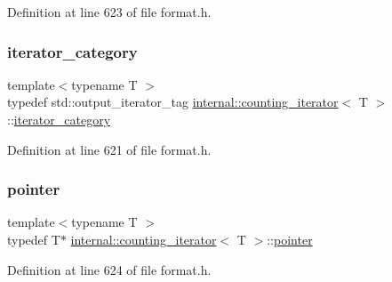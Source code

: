 Definition at line 623 of file format.\+h.

\mbox{\label{classinternal_1_1counting__iterator_a2401fdba243c84c268b562611bed7333}} 
\subsubsection{\texorpdfstring{iterator\+\_\+category}{iterator\_category}}
{\footnotesize\ttfamily template$<$typename T $>$ \\
typedef std\+::output\+\_\+iterator\+\_\+tag \hyperlink{classinternal_1_1counting__iterator}{internal\+::counting\+\_\+iterator}$<$ T $>$\+::\hyperlink{classinternal_1_1counting__iterator_a2401fdba243c84c268b562611bed7333}{iterator\+\_\+category}}



Definition at line 621 of file format.\+h.

\mbox{\label{classinternal_1_1counting__iterator_a0e58a232d34bffbc41fc5bd7bb75f962}} 
\subsubsection{\texorpdfstring{pointer}{pointer}}
{\footnotesize\ttfamily template$<$typename T $>$ \\
typedef T$\ast$ \hyperlink{classinternal_1_1counting__iterator}{internal\+::counting\+\_\+iterator}$<$ T $>$\+::\hyperlink{classinternal_1_1counting__iterator_a0e58a232d34bffbc41fc5bd7bb75f962}{pointer}}



Definition at line 624 of file format.\+h.

\mbox{\label{classinternal_1_1counting__iterator_a040c67c71ec6569100eda9296fbd914f}} 
